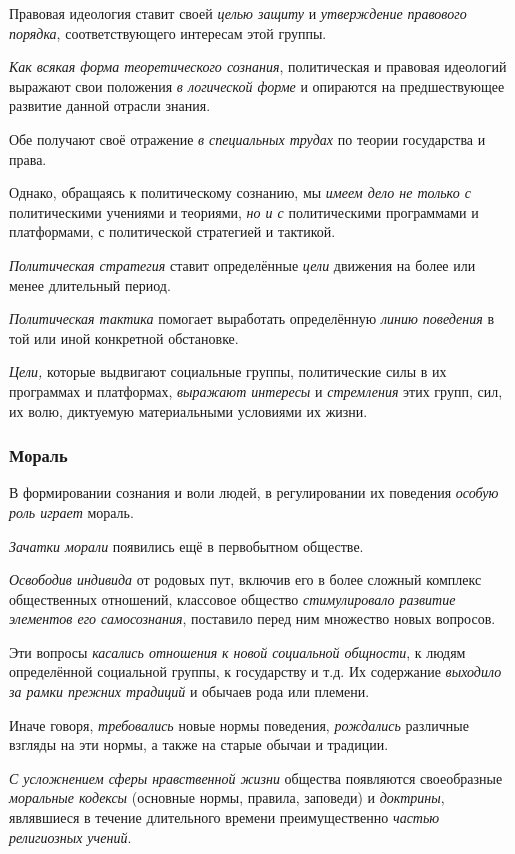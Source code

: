 \documentclass[a4paper,14pt,russian]{extreport}
\begin{document}
Правовая идеология ставит своей \emph{целью защиту} и \emph{утверждение} \emph{правового порядка}, соответствующего интересам этой группы.

\emph{Как всякая форма теоретического сознания}, политическая и правовая идеологий выражают свои положения \emph{в логической форме} и опираются на предшествующее развитие данной отрасли знания.

Обе получают своё отражение \emph{в специальных трудах} по теории государства и права.

Однако, обращаясь к политическому сознанию, мы \emph{имеем дело не только с} политическими учениями и теориями, \emph{но и с} политическими программами и платформами, с политической стратегией и тактикой.

\emph{Политическая стратегия} ставит определённые \emph{цели} движения на более или менее длительный период.

\emph{Политическая тактика} помогает выработать определённую \emph{линию поведения} в той или иной конкретной обстановке.

\emph{Цели,} которые выдвигают социальные группы, политические силы в их программах и платформах, \emph{выражают интересы} и \emph{стремления} этих групп, сил, их волю, диктуемую материальными условиями их жизни.

\subsubsection{Мораль}

В формировании сознания и воли людей, в регулировании их поведения \emph{особую роль играет} мораль.

\emph{Зачатки морали} появились ещё в первобытном обществе.

\emph{Освободив индивида} от родовых пут, включив его в более сложный комплекс общественных отношений, классовое общество \emph{стимулировало развитие элементов его самосознания}, поставило перед ним множество новых вопросов.

Эти вопросы \emph{касались отношения} \emph{к новой социальной общности}, к людям определённой социальной группы, к государству и т.д. Их содержание \emph{выходило за рамки прежних традиций} и обычаев рода или племени.

Иначе говоря, \emph{требовались} новые нормы поведения, \emph{рождались} различные взгляды на эти нормы, а также на старые обычаи и традиции.

\emph{С усложнением сферы нравственной жизни} общества появляются своеобразные \emph{моральные кодексы} (основные нормы, правила, заповеди) и \emph{доктрины}, являвшиеся в течение длительного времени преимущественно \emph{частью религиозных учений}.
\end{document}
